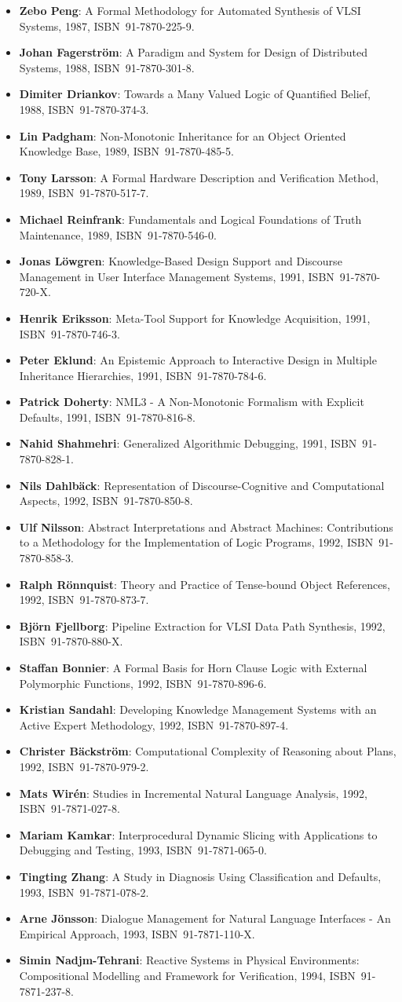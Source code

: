 \documentclass[a4paper,showtrims,twocolumn]{memoir}
\newenvironment{theses}{
  \begin{itemize}
    \setlength{\itemsep}{0.2em}
    \setlength{\parskip}{0em}
    \setlength{\parsep}{0em}
}{
  \end{itemize}
}
\newcommand{\thesis}[5]{\item[No.~#1] \textbf{#2}: #3, #4, ISBN~#5.}
\begin{document}
\begin{theses}
    \thesis{170}{Zebo Peng}{A Formal Methodology for Automated Synthesis of VLSI Systems}{1987}{91-7870-225-9}
    \thesis{174}{Johan Fagerström}{A Paradigm and System for Design of Distributed Systems}{1988}{91-7870-301-8}
    \thesis{192}{Dimiter Driankov}{Towards a Many Valued Logic of Quantified Belief}{1988}{91-7870-374-3}
    \thesis{213}{Lin Padgham}{Non-Monotonic Inheritance for an Object Oriented Knowledge Base}{1989}{91-7870-485-5}
    \thesis{214}{Tony Larsson}{A Formal Hardware Description and Verification Method}{1989}{91-7870-517-7}
    \thesis{221}{Michael Reinfrank}{Fundamentals and Logical Foundations of Truth Maintenance}{1989}{91-7870-546-0}
    \thesis{239}{Jonas Löwgren}{Knowledge-Based Design Support and Discourse Management in User Interface Management Systems}{1991}{91-7870-720-X}
    \thesis{244}{Henrik Eriksson}{Meta-Tool Support for Knowledge Acquisition}{1991}{91-7870-746-3}
    \thesis{252}{Peter Eklund}{An Epistemic Approach to Interactive Design in Multiple Inheritance Hierarchies}{1991}{91-7870-784-6}
    \thesis{258}{Patrick Doherty}{NML3 - A Non-Monotonic Formalism with Explicit Defaults}{1991}{91-7870-816-8}
    \thesis{260}{Nahid Shahmehri}{Generalized Algorithmic Debugging}{1991}{91-7870-828-1}
    \thesis{264}{Nils Dahlbäck}{Representation of Discourse-Cognitive and Computational Aspects}{1992}{91-7870-850-8}
    \thesis{265}{Ulf Nilsson}{Abstract Interpretations and Abstract Machines: Contributions to a Methodology for the Implementation of Logic Programs}{1992}{91-7870-858-3}
    \thesis{270}{Ralph Rönnquist}{Theory and Practice of Tense-bound Object References}{1992}{91-7870-873-7}
    \thesis{273}{Björn Fjellborg}{Pipeline Extraction for VLSI Data Path Synthesis}{1992}{91-7870-880-X}
    \thesis{276}{Staffan Bonnier}{A Formal Basis for Horn Clause Logic with External Polymorphic Functions}{1992}{91-7870-896-6}
    \thesis{277}{Kristian Sandahl}{Developing Knowledge Management Systems with an Active Expert Methodology}{1992}{91-7870-897-4}
    \thesis{281}{Christer Bäckström}{Computational Complexity of Reasoning about Plans}{1992}{91-7870-979-2}
    \thesis{292}{Mats Wirén}{Studies in Incremental Natural Language Analysis}{1992}{91-7871-027-8}
    \thesis{297}{Mariam Kamkar}{Interprocedural Dynamic Slicing with Applications to Debugging and Testing}{1993}{91-7871-065-0}
    \thesis{302}{Tingting Zhang}{A Study in Diagnosis Using Classification and Defaults}{1993}{91-7871-078-2}
    \thesis{312}{Arne Jönsson}{Dialogue Management for Natural Language Interfaces - An Empirical Approach}{1993}{91-7871-110-X}
    \thesis{338}{Simin Nadjm-Tehrani}{Reactive Systems in Physical Environments: Compositional Modelling and Framework for Verification}{1994}{91-7871-237-8}

\end{theses}
\end{document}
